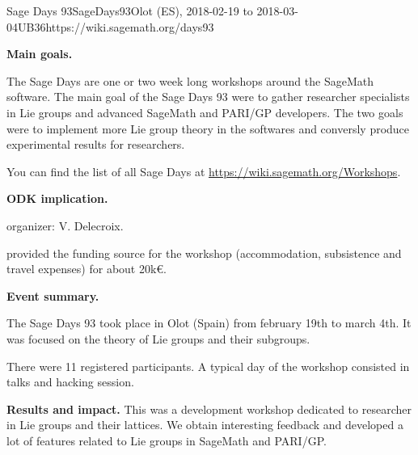 \begin{event}{Sage Days 93}{SageDays93}{Olot (ES),
2018-02-19 to 2018-03-04}{UB}{36}{https://wiki.sagemath.org/days93}

\textbf{Main goals.}

The Sage Days are one or two week long workshops around the
SageMath software. The main goal of the Sage Days 93 were to
gather researcher specialists in Lie groups and advanced
SageMath and PARI/GP developers. The two goals were to implement
more Lie group theory in the softwares and conversly produce
experimental results for researchers.

You can find the list of all Sage Days at
\url{https://wiki.sagemath.org/Workshops}.

\textbf{ODK implication.} 

\ODK organizer: V. Delecroix.

\ODK provided the funding source for the workshop (accommodation,
subsistence and travel expenses) for about 20k\euro.

\textbf{Event summary.} 

The Sage Days 93 took place in Olot (Spain) from february 19th to
march 4th. It was focused on the theory of Lie groups and their
subgroups.

There were 11 registered participants. A typical day of the workshop
consisted in talks and hacking session.

\textbf{Results and impact.} 
This was a development workshop dedicated to researcher in Lie groups
and their lattices. We obtain interesting feedback and developed
a lot of features related to Lie groups in SageMath and PARI/GP.
\end{event}
